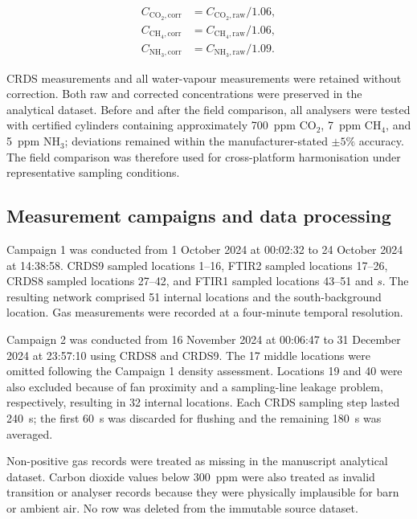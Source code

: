 \documentclass[12pt,a4paper]{article}
\begin{document}
\begin{align}
C_{\mathrm{CO_2,corr}} &= C_{\mathrm{CO_2,raw}}/1.06,\\
C_{\mathrm{CH_4,corr}} &= C_{\mathrm{CH_4,raw}}/1.06,\\
C_{\mathrm{NH_3,corr}} &= C_{\mathrm{NH_3,raw}}/1.09.
\end{align}

CRDS measurements and all water-vapour measurements were retained without
correction. Both raw and corrected concentrations were preserved in the
analytical dataset. Before and after the field comparison, all analysers were
tested with certified cylinders containing approximately \SI{700}{ppm}
\(\mathrm{CO_2}\), \SI{7}{ppm} \(\mathrm{CH_4}\), and \SI{5}{ppm}
\(\mathrm{NH_3}\); deviations remained within the manufacturer-stated
\(\pm 5\%\) accuracy. The field comparison was therefore used for
cross-platform harmonisation under representative sampling conditions.

\subsection{Measurement campaigns and data processing}

Campaign 1 was conducted from 1 October 2024 at 00:02:32 to 24 October 2024 at
14:38:58. CRDS9 sampled locations 1--16, FTIR2 sampled locations 17--26,
CRDS8 sampled locations 27--42, and FTIR1 sampled locations 43--51 and \(s\).
The resulting network comprised 51 internal locations and the
south-background location. Gas measurements were recorded at a four-minute
temporal resolution.

Campaign 2 was conducted from 16 November 2024 at 00:06:47 to 31 December
2024 at 23:57:10 using CRDS8 and CRDS9. The 17 middle locations were omitted
following the Campaign 1 density assessment. Locations 19 and 40 were also
excluded because of fan proximity and a sampling-line leakage problem,
respectively, resulting in 32 internal locations. Each CRDS sampling step
lasted \SI{240}{s}; the first \SI{60}{s} was discarded for flushing and the
remaining \SI{180}{s} was averaged.

Non-positive gas records were treated as missing in the manuscript analytical
dataset. Carbon dioxide values below \SI{300}{ppm} were also treated as
invalid transition or analyser records because they were physically
implausible for barn or ambient air. No row was deleted from the immutable
source dataset.
\end{document}
